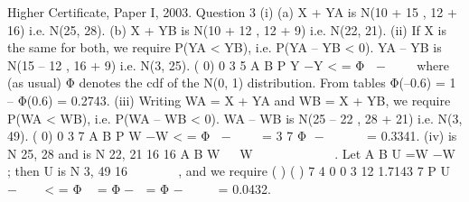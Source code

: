 \documentclass[a4paper,12pt]{article}
\begin{document}
Higher Certificate, Paper I, 2003. Question 3
(i) (a) X + YA is N(10 + 15 , 12 + 16) i.e. N(25, 28).
(b) X + YB is N(10 + 12 , 12 + 9) i.e. N(22, 21).
(ii) If X is the same for both, we require P(YA < YB), i.e. P(YA – YB < 0).
YA – YB is N(15 – 12 , 16 + 9) i.e. N(3, 25).
( 0) 0 3
5 A B P Y −Y < = Φ − 
 
where (as usual) Φ denotes the cdf of the N(0, 1)
distribution. From tables Φ(–0.6) = 1 – Φ(0.6) = 0.2743.
(iii) Writing WA = X + YA and WB = X + YB, we require P(WA < WB), i.e.
P(WA – WB < 0).
WA – WB is N(25 – 22 , 28 + 21) i.e. N(3, 49).
( 0) 0 3
7 A B P W −W < = Φ − 
 
= 3
7
Φ −   
 
= 0.3341.
(iv) is N 25, 28 and is N 22, 21
16 16 A B W   W  
   
   
.
Let A B U =W −W ; then U is N 3, 49
16
 
 
 
, and we require
( ) ( ) 7
4
0 0 3 12 1.7143
7
P U
 −    < = Φ  = Φ−  = Φ −
   
= 0.0432.
\end{document}
